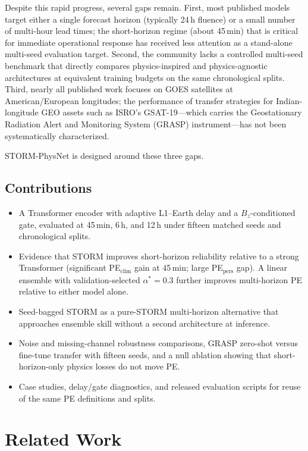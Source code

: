 ﻿\documentclass{ieeeaccess}
\begin{document}
Despite this rapid progress, several gaps remain. First, most published models
target either a single forecast horizon (typically 24\,h fluence) or a small
number of multi-hour lead times; the short-horizon regime (about 45\,min) that
is critical for immediate operational response has received less attention as a
stand-alone multi-seed evaluation target. Second, the community lacks a
controlled multi-seed benchmark that directly compares physics-inspired and
physics-agnostic architectures at equivalent training budgets on the same
chronological splits. Third, nearly all published work focuses on GOES satellites
at American/European longitudes; the performance of transfer strategies for
Indian-longitude GEO assets such as ISRO's GSAT-19---which carries the
Geostationary Radiation Alert and Monitoring System (GRASP) instrument---has not
been systematically characterized.

STORM-PhysNet is designed around these three gaps.

\subsection{Contributions}
\begin{itemize}
\item A Transformer encoder with adaptive L1--Earth delay and a
\(B_z\)-conditioned gate, evaluated at 45\,min, 6\,h, and 12\,h under
fifteen matched seeds and chronological splits.
\item Evidence that STORM improves short-horizon reliability relative to
a strong Transformer (significant PE\(_{\mathrm{clim}}\) gain at 45\,min;
large PE\(_{\mathrm{pers}}\) gap). A linear ensemble with
validation-selected \(\alpha^*=0.3\) further improves multi-horizon PE
relative to either model alone.
\item Seed-bagged STORM as a pure-STORM multi-horizon alternative that
approaches ensemble skill without a second architecture at inference.
\item Noise and missing-channel robustness comparisons, GRASP
zero-shot versus fine-tune transfer with fifteen seeds, and a null
ablation showing that short-horizon-only physics losses do not move PE.
\item Case studies, delay/gate diagnostics, and released evaluation
scripts for reuse of the same PE definitions and splits.
\end{itemize}


\section{Related Work}
\label{sec:related}
\end{document}
